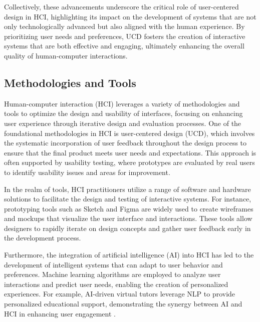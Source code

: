 Collectively, these advancements underscore the critical role of user-centered design in HCI, highlighting its impact on the development of systems that are not only technologically advanced but also aligned with the human experience. By prioritizing user needs and preferences, UCD fosters the creation of interactive systems that are both effective and engaging, ultimately enhancing the overall quality of human-computer interactions.


\subsection{Methodologies and Tools} \label{subsec:Methodologies and Tools}

Human-computer interaction (HCI) leverages a variety of methodologies and tools to optimize the design and usability of interfaces, focusing on enhancing user experience through iterative design and evaluation processes. One of the foundational methodologies in HCI is user-centered design (UCD), which involves the systematic incorporation of user feedback throughout the design process to ensure that the final product meets user needs and expectations. This approach is often supported by usability testing, where prototypes are evaluated by real users to identify usability issues and areas for improvement.



In the realm of tools, HCI practitioners utilize a range of software and hardware solutions to facilitate the design and testing of interactive systems. For instance, prototyping tools such as Sketch and Figma are widely used to create wireframes and mockups that visualize the user interface and interactions. These tools allow designers to rapidly iterate on design concepts and gather user feedback early in the development process.



Furthermore, the integration of artificial intelligence (AI) into HCI has led to the development of intelligent systems that can adapt to user behavior and preferences. Machine learning algorithms are employed to analyze user interactions and predict user needs, enabling the creation of personalized experiences. For example, AI-driven virtual tutors leverage NLP to provide personalized educational support, demonstrating the synergy between AI and HCI in enhancing user engagement \cite{thapliyal2022crossmodal3600massivelymultilingualmultimodal}.



